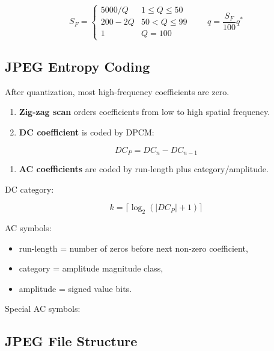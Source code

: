 \[
S_F=
\begin{cases}
5000/Q & 1\leq Q\leq50\\
200-2Q & 50<Q\leq99\\
1 & Q=100
\end{cases}
\qquad
q=\frac{S_F}{100}q^*
\]

\subsection{JPEG Entropy Coding}

After quantization, most high-frequency coefficients are zero.

\begin{enumerate}
  \item \textbf{Zig-zag scan} orders coefficients from low to high spatial frequency.
  \item \textbf{DC coefficient} is coded by DPCM:
\end{enumerate}

\[
DC_P=DC_n-DC_{n-1}
\]

\begin{enumerate}
  \item \textbf{AC coefficients} are coded by run-length plus category/amplitude.
\end{enumerate}

DC category:

\[
k=\lceil\log_2(|DC_P|+1)\rceil
\]

AC symbols:

\begin{itemize}
  \item run-length = number of zeros before next non-zero coefficient,
  \item category = amplitude magnitude class,
  \item amplitude = signed value bits.
\end{itemize}

Special AC symbols:

\begin{center}
\end{center}

\subsection{JPEG File Structure}


